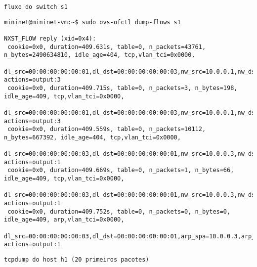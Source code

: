 \documentclass[12pt,letterpaper]{article}
\begin{document}
\begin{verbatim}
fluxo do switch s1
\end{verbatim}

\begin{tiny}
\begin{verbatim}
mininet@mininet-vm:~$ sudo ovs-ofctl dump-flows s1

NXST_FLOW reply (xid=0x4):
 cookie=0x0, duration=409.631s, table=0, n_packets=43761, n_bytes=2490634810, idle_age=404, tcp,vlan_tci=0x0000,
 dl_src=00:00:00:00:00:01,dl_dst=00:00:00:00:00:03,nw_src=10.0.0.1,nw_dst=10.0.0.3,nw_tos=0,tp_src=46016,tp_dst=5001 actions=output:3
 cookie=0x0, duration=409.715s, table=0, n_packets=3, n_bytes=198, idle_age=409, tcp,vlan_tci=0x0000,
 dl_src=00:00:00:00:00:01,dl_dst=00:00:00:00:00:03,nw_src=10.0.0.1,nw_dst=10.0.0.3,nw_tos=16,tp_src=46014,tp_dst=5001 actions=output:3
 cookie=0x0, duration=409.559s, table=0, n_packets=10112, n_bytes=667392, idle_age=404, tcp,vlan_tci=0x0000,
 dl_src=00:00:00:00:00:03,dl_dst=00:00:00:00:00:01,nw_src=10.0.0.3,nw_dst=10.0.0.1,nw_tos=0,tp_src=5001,tp_dst=46016 actions=output:1
 cookie=0x0, duration=409.669s, table=0, n_packets=1, n_bytes=66, idle_age=409, tcp,vlan_tci=0x0000,
 dl_src=00:00:00:00:00:03,dl_dst=00:00:00:00:00:01,nw_src=10.0.0.3,nw_dst=10.0.0.1,nw_tos=0,tp_src=5001,tp_dst=46014 actions=output:1
 cookie=0x0, duration=409.752s, table=0, n_packets=0, n_bytes=0, idle_age=409, arp,vlan_tci=0x0000,
 dl_src=00:00:00:00:00:03,dl_dst=00:00:00:00:00:01,arp_spa=10.0.0.3,arp_tpa=10.0.0.1,arp_op=2 actions=output:1

\end{verbatim}
\end{tiny}

\begin{verbatim}
tcpdump do host h1 (20 primeiros pacotes)
\end{verbatim}
\end{document}
